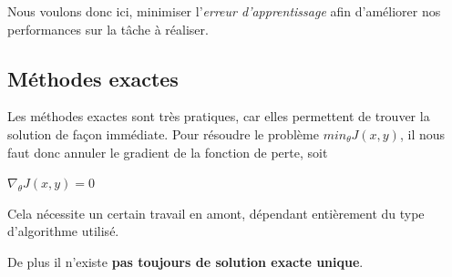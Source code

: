 \documentclass[a4paper, 11pt]{report}
\begin{document}
Nous voulons donc ici, minimiser l'\emph{erreur d'apprentissage} afin d'améliorer nos performances sur la tâche à réaliser.
\subsection{Méthodes exactes}
Les méthodes exactes sont très pratiques, car elles permettent de trouver la solution de façon immédiate.
Pour résoudre le problème $min_{\theta}J(x,y)$, il nous faut donc annuler le gradient de la fonction de perte, soit
\begin{center}
	$\nabla_{\theta} J(x,y) = 0$
\end{center}
Cela nécessite un certain travail en amont, dépendant entièrement du type d'algorithme utilisé.

De plus il n'existe \textbf{pas toujours de solution exacte unique}.
\end{document}
